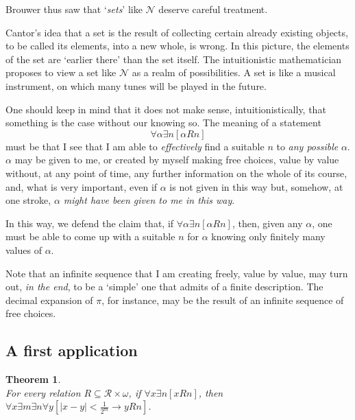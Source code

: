 \documentclass[a4paper]{amsart}
\theoremstyle{plain}
\newtheorem{theorem}{Theorem}
\begin{document}
Brouwer thus saw that `{\it sets}' like $\mathcal{N}$ deserve careful treatment.


Cantor's idea that a set is the result of collecting certain already existing  objects, to be called its elements, into a new whole, is wrong. In this picture, the elements of the set are `earlier there' than the set itself. The intuitionistic mathematician proposes to view a set like $\mathcal{N}$ as a realm of possibilities. A set is like a musical instrument, on which many tunes will be played in the future.

One should keep in mind that it does not make sense, intuitionistically, that something is the case without our knowing so. The meaning of  a statement $$\forall \alpha\exists n[\alpha Rn]$$ must be that I see that I am able to {\it effectively} find a suitable $n$ to {\it any possible} $\alpha$.  $\alpha$ may be given to me, or created by myself making free choices,  value by value without,  at any point of time, any further information on the whole of its course, and, what is very important, even if $\alpha$ is not given in this way but, somehow, at one stroke, {\it $\alpha$ might have been given to me in this way}.  

In this way, we defend the claim that, if $\forall \alpha\exists n[\alpha Rn]$,  then, given any $\alpha$, one must be able to come up with a suitable $n$ for $\alpha$ knowing only finitely many  values of $\alpha$.

 Note that    an infinite sequence that I am creating freely, value by value,   may turn out, {\it in the end}, to be a `simple' one that admits of a finite description. The decimal expansion of $\pi$, for instance,  may be the result of an infinite sequence of free choices.
 
 \subsection{A first application}
\begin{theorem}\label{T:realcont} $\;$\\For every relation $R\subseteq \mathcal{R}\times \omega$, if $\forall x \exists n[x Rn]$, then $\forall x\exists m  \exists n \forall y[|x-y|<\frac{1}{2^m}\rightarrow yRn]$. \end{theorem}
\end{document}
